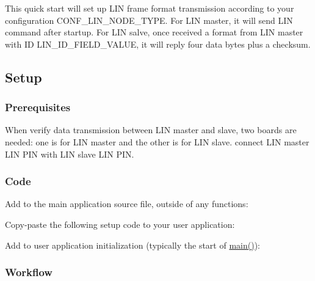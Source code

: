 This quick start will set up L\+IN frame format transmission according to your configuration {\ttfamily C\+O\+N\+F\+\_\+\+L\+I\+N\+\_\+\+N\+O\+D\+E\+\_\+\+T\+Y\+PE}. For L\+IN master, it will send L\+IN command after startup. For L\+IN salve, once received a format from L\+IN master with ID {\ttfamily L\+I\+N\+\_\+\+I\+D\+\_\+\+F\+I\+E\+L\+D\+\_\+\+V\+A\+L\+UE}, it will reply four data bytes plus a checksum.\hypertarget{asfdoc_sam0_sercom_usart_lin_use_case_asfdoc_sam0_sercom_usart_lin_use_case_setup}{}\subsection{Setup}\label{asfdoc_sam0_sercom_usart_lin_use_case_asfdoc_sam0_sercom_usart_lin_use_case_setup}
\hypertarget{asfdoc_sam0_sercom_usart_lin_use_case_asfdoc_sam0_sercom_usart_lin_use_case_prereq}{}\subsubsection{Prerequisites}\label{asfdoc_sam0_sercom_usart_lin_use_case_asfdoc_sam0_sercom_usart_lin_use_case_prereq}
When verify data transmission between L\+IN master and slave, two boards are needed\+: one is for L\+IN master and the other is for L\+IN slave. connect L\+IN master L\+IN P\+IN with L\+IN slave L\+IN P\+IN.\hypertarget{asfdoc_sam0_sercom_usart_lin_use_case_asfdoc_sam0_usart_lin_use_case_setup_code}{}\subsubsection{Code}\label{asfdoc_sam0_sercom_usart_lin_use_case_asfdoc_sam0_usart_lin_use_case_setup_code}
Add to the main application source file, outside of any functions\+: 
\begin{DoxyCodeInclude}{0}
\end{DoxyCodeInclude}
 Copy-\/paste the following setup code to your user application\+: 
\begin{DoxyCodeInclude}{0}
\end{DoxyCodeInclude}
 Add to user application initialization (typically the start of {\ttfamily \mbox{\hyperlink{csc__app_8c_a840291bc02cba5474a4cb46a9b9566fe}{main()}}})\+: 
\begin{DoxyCodeInclude}{0}
\end{DoxyCodeInclude}
 \hypertarget{asfdoc_sam0_sercom_usart_lin_use_case_asfdoc_sam0_usart_lin_use_case_setup_flow}{}\subsubsection{Workflow}\label{asfdoc_sam0_sercom_usart_lin_use_case_asfdoc_sam0_usart_lin_use_case_setup_flow}

